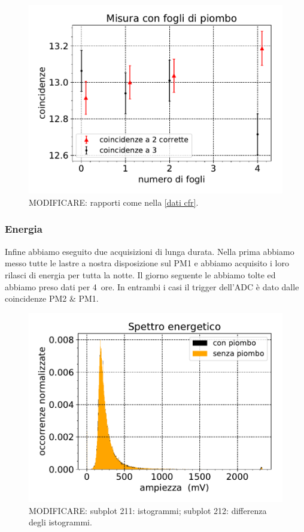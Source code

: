 \begin{figure}[h]
\centering
\includegraphics[width=8 cm]{confronto}
\caption{MODIFICARE: rapporti come nella \autoref{dati cfr}.}
\label{cfr}
\end{figure}

\subsubsection{Energia}

Infine abbiamo eseguito due acquisizioni di lunga durata.
Nella prima abbiamo messo tutte le lastre a nostra disposizione sul PM1
e abbiamo acquisito i loro rilasci di energia per tutta la notte.
Il giorno seguente le abbiamo tolte ed abbiamo preso dati per \SI{4}{ore}.
In entrambi i casi il trigger dell'ADC è dato dalle coincidenze PM2 \& PM1.

\begin{figure}[h]
\centering
\includegraphics[width=8 cm]{gemelli}
\caption{MODIFICARE:
subplot 211: istogrammi;
subplot 212: differenza degli istogrammi.}
\label{gemini}    
\end{figure}
